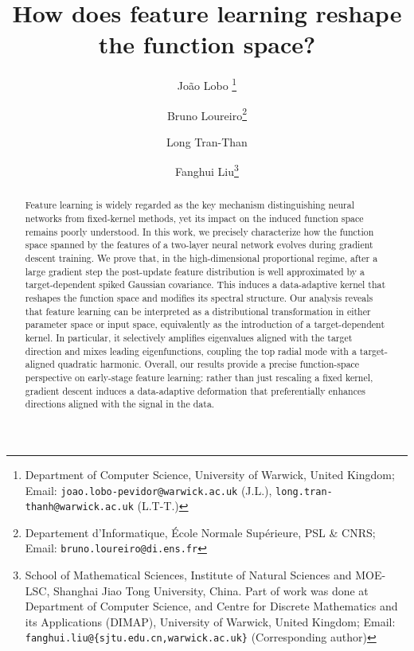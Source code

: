 \documentclass[11pt]{article}
\title{\textbf{How does feature learning reshape the function space?}}
\author
{
     João Lobo \thanks{Department of Computer Science, University of Warwick, 
        United Kingdom; Email: {\tt joao.lobo-pevidor@warwick.ac.uk} (J.L.), 
        {\tt long.tran-thanh@warwick.ac.uk} (L.T-T.)}
     \and
     Bruno Loureiro\thanks{Departement d'Informatique, \'Ecole Normale Sup\'erieure, PSL \& CNRS; Email: {\tt bruno.loureiro@di.ens.fr}}
     \and
     Long Tran-Than \footnotemark[1]
     \and
     Fanghui Liu\thanks{School of Mathematical Sciences, Institute of Natural Sciences and MOE-LSC, Shanghai Jiao Tong University, China. Part of work was done at Department of Computer Science, and Centre for Discrete Mathematics and its Applications (DIMAP), University of Warwick, United Kingdom; Email: {\tt fanghui.liu@\{sjtu.edu.cn,warwick.ac.uk\}} (Corresponding author)}
}
\date{}
\newcommand{\disableaddcontentsline}{%
  \let\savedaddcontentsline\addcontentsline 
  \renewcommand{\addcontentsline}[3]{}
}
\begin{document}
\disableaddcontentsline

\newcommand{\fh}[1]{\textcolor{fhcolor}{(Fanghui: #1)}}

\newcommand{\jcomment}[1]{\textcolor{olive}{(João: #1)}}

\maketitle

\begin{abstract}
Feature learning is widely regarded as the key mechanism distinguishing neural networks from fixed-kernel methods, yet its impact on the induced function space remains poorly understood. In this work, we precisely characterize how the function space spanned by the features of a two-layer neural network evolves during gradient descent training.
%
We prove that, in the high-dimensional proportional regime, after a large gradient step the post-update feature distribution is well approximated by a target-dependent spiked Gaussian covariance. This induces a data-adaptive kernel that reshapes the function space and modifies its spectral structure.
%
Our analysis reveals that feature learning can be interpreted as a distributional transformation in either parameter space or input space, equivalently as the introduction of a target-dependent kernel. In particular, it selectively amplifies eigenvalues aligned with the target direction and mixes leading eigenfunctions, coupling the top radial mode with a target-aligned quadratic harmonic.
%
%
Overall, our results provide a precise function-space perspective on early-stage feature learning: rather than just rescaling a fixed kernel, gradient descent induces a data-adaptive deformation that preferentially enhances directions aligned with the signal in the data.
\end{abstract}









\end{document}
